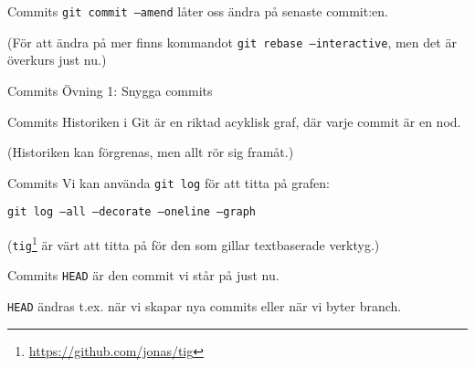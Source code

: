 \documentclass[11pt,xetex]{beamer}
\begin{document}
\begin{frame}{Commits}
  \Large
  \texttt{git commit --amend} låter oss ändra på senaste commit:en.

  \normalsize
  (För att ändra på mer finns kommandot \texttt{git rebase
      --interactive}, men det är överkurs just nu.)
\end{frame}

\begin{frame}{Commits}
  \Large
  Övning 1: Snygga commits
\end{frame}

\begin{frame}{Commits}
  \Large
  Historiken i Git är en riktad acyklisk graf, där varje commit är en nod.

  \small
  (Historiken kan förgrenas, men allt rör sig framåt.)
\end{frame}

\begin{frame}{Commits}
  \Large
  Vi kan använda \texttt{git log} för att titta på grafen:

  \texttt{git log --all --decorate --oneline --graph}

  \vspace{1em}

  \normalsize
  (\texttt{tig}\footnote{\url{https://github.com/jonas/tig}} är värt
  att titta på för den som gillar textbaserade verktyg.)
\end{frame}

\begin{frame}{Commits}
  \Large
  \texttt{HEAD} är den commit vi står på just nu.

  \small
  \texttt{HEAD} ändras t.ex. när vi skapar nya commits eller när vi
  byter branch.
\end{frame}
\end{document}
